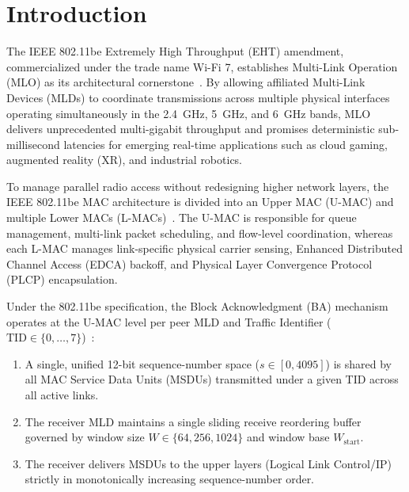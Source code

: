 \documentclass[10pt,journal,compsoc]{IEEEtran}
\begin{document}
\maketitle
\IEEEdisplaynontitleabstractindextext
\IEEEpeerreviewmaketitle

\section{Introduction}
\label{sec:intro}

The IEEE 802.11be Extremely High Throughput (EHT) amendment, commercialized under the trade name Wi-Fi 7, establishes Multi-Link Operation (MLO) as its architectural cornerstone~\cite{ieee80211be2024}. By allowing affiliated Multi-Link Devices (MLDs) to coordinate transmissions across multiple physical interfaces operating simultaneously in the 2.4~GHz, 5~GHz, and 6~GHz bands, MLO delivers unprecedented multi-gigabit throughput and promises deterministic sub-millisecond latencies for emerging real-time applications such as cloud gaming, augmented reality (XR), and industrial robotics.

To manage parallel radio access without redesigning higher network layers, the IEEE 802.11be MAC architecture is divided into an Upper MAC (U-MAC) and multiple Lower MACs (L-MACs)~\cite{choi2025joint}. The U-MAC is responsible for queue management, multi-link packet scheduling, and flow-level coordination, whereas each L-MAC manages link-specific physical carrier sensing, Enhanced Distributed Channel Access (EDCA) backoff, and Physical Layer Convergence Protocol (PLCP) encapsulation.

Under the 802.11be specification, the Block Acknowledgment (BA) mechanism operates at the U-MAC level per peer MLD and Traffic Identifier ($\text{TID} \in \{0, \dots, 7\}$)~\cite{ieee80211be2024}:
\begin{enumerate}
    \item A single, unified 12-bit sequence-number space ($s \in [0, 4095]$) is shared by all MAC Service Data Units (MSDUs) transmitted under a given TID across all active links.
    \item The receiver MLD maintains a single sliding receive reordering buffer governed by window size $W \in \{64, 256, 1024\}$ and window base $W_{\text{start}}$.
    \item The receiver delivers MSDUs to the upper layers (Logical Link Control/IP) strictly in monotonically increasing sequence-number order.
\end{enumerate}
\end{document}
